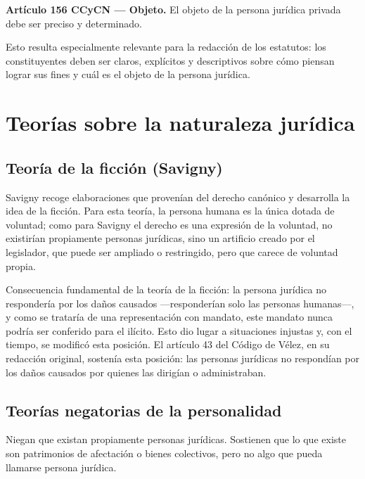 \documentclass[12pt,oneside]{book}
\begin{document}
\begin{important}
\textbf{Artículo 156 CCyCN --- Objeto.} El objeto de la persona jurídica privada debe ser preciso y determinado.
\end{important}

Esto resulta especialmente relevante para la redacción de los estatutos: los constituyentes deben ser claros, explícitos y descriptivos sobre cómo piensan lograr sus fines y cuál es el objeto de la persona jurídica.

\section{Teorías sobre la naturaleza jurídica}

\subsection{Teoría de la ficción (Savigny)}

Savigny recoge elaboraciones que provenían del derecho canónico y desarrolla la idea de la ficción. Para esta teoría, la persona humana es la única dotada de voluntad; como para Savigny el derecho es una expresión de la voluntad, no existirían propiamente personas jurídicas, sino un artificio creado por el legislador, que puede ser ampliado o restringido, pero que carece de voluntad propia.

\begin{important}
Consecuencia fundamental de la teoría de la ficción: la persona jurídica no respondería por los daños causados —responderían solo las personas humanas—, y como se trataría de una representación con mandato, este mandato nunca podría ser conferido para el ilícito. Esto dio lugar a situaciones injustas y, con el tiempo, se modificó esta posición. El artículo 43 del Código de Vélez, en su redacción original, sostenía esta posición: las personas jurídicas no respondían por los daños causados por quienes las dirigían o administraban.
\end{important}

\subsection{Teorías negatorias de la personalidad}

Niegan que existan propiamente personas jurídicas. Sostienen que lo que existe son patrimonios de afectación o bienes colectivos, pero no algo que pueda llamarse persona jurídica.
\end{document}
